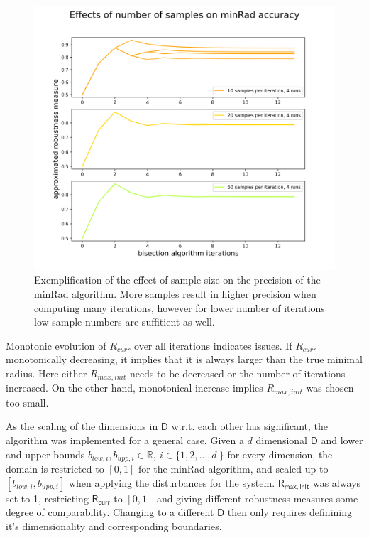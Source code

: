     \begin{figure}[ht] 
    \centering
    \includegraphics[width=.9\linewidth]{figures/minRad_tuning_graph.png}
    \caption[minRad Tuning]{Exemplification of the effect of sample size on the precision of the minRad algorithm. More samples result in higher precision when computing many iterations, however for lower number of iterations low sample numbers are suffitient as well.}
    \label{fig:minradcomp}
    \end{figure}

    Monotonic evolution of $R_{curr}$ over all iterations indicates issues. If $R_{curr}$ monotonically decreasing, it implies that it is always larger than the true minimal radius. Here either $R_{max,init}$ needs to be decreased or the number of iterations increased. On the other hand, monotonical increase implies $R_{max,init}$ was chosen too small.

    As the scaling of the dimensions in $\mathsf{D}$ w.r.t. each other has significant, the algorithm was implemented for a general case. Given a $d$ dimensional $\mathsf{D}$ and lower and upper bounds $b_{low,i}, b_{upp,i} \in \mathbb{R},\ i \in \{1,2,\ldots,d\ \}$ for every dimension, the domain is restricted to $[0,1]$ for the minRad algorithm, and scaled up to $[b_{low,i}, b_{upp,i}]$ when applying the disturbances for the system. $\mathsf{R_{max,init}}$ was always set to 1, restricting $\mathsf{R_{curr}}$ to $[0,1]$ and giving different robustness measures some degree of comparability. 
    Changing to a different $\mathsf{D}$ then only requires definining it's dimensionality and corresponding boundaries.

